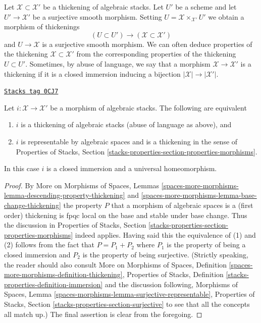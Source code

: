 Let $\mathcal{X} \subset \mathcal{X}'$ be a thickening of algebraic stacks.
Let $U'$ be a scheme and let $U' \to \mathcal{X}'$ be a surjective smooth
morphism. Setting $U = \mathcal{X} \times_{\mathcal{X}'} U'$ we obtain
a morphism of thickenings
$$
(U \subset U') \longrightarrow (\mathcal{X} \subset \mathcal{X}')
$$
and $U \to \mathcal{X}$ is a surjective smooth morphism. We can often
deduce properties of the thickening $\mathcal{X} \subset \mathcal{X}'$
from the corresponding properties of the thickening $U \subset U'$.
Sometimes, by abuse of language, we say that a morphism
$\mathcal{X} \to \mathcal{X}'$ is a thickening if it is a closed
immersion inducing a bijection $|\mathcal{X}| \to |\mathcal{X}'|$.

\begin{lemma}[Thickening]
\label{stacks-more-morphisms-lemma-thickening}
\href{https://stacks.math.columbia.edu/tag/0CJ7}{\texttt{Stacks tag 0CJ7}}

Let $i : \mathcal{X} \to \mathcal{X}'$ be a morphism of algebraic stacks.
The following are equivalent
\begin{enumerate}
\item $i$ is a thickening of algebraic stacks (abuse of language as above), and
\item $i$ is representable by algebraic spaces and
is a thickening in the sense of Properties of Stacks, Section
\ref{stacks-properties-section-properties-morphisms}.
\end{enumerate}
In this case $i$ is a closed immersion and a universal homeomorphism.
\end{lemma}

\begin{proof}
By More on Morphisms of Spaces, Lemmas
\ref{spaces-more-morphisms-lemma-descending-property-thickening} and
\ref{spaces-more-morphisms-lemma-base-change-thickening}
the property $P$ that a morphism of algebraic spaces is a
(first order) thickening is fpqc local on the base and stable under base
change. Thus the discussion in Properties of Stacks, Section
\ref{stacks-properties-section-properties-morphisms} indeed applies.
Having said this the equivalence of (1) and (2) follows from
the fact that $P = P_1 + P_2$ where $P_1$ is the property of being
a closed immersion and $P_2$ is the property of being surjective.
(Strictly speaking, the reader should also consult
More on Morphisms of Spaces, Definition
\ref{spaces-more-morphisms-definition-thickening},
Properties of Stacks, Definition \ref{stacks-properties-definition-immersion}
and the discussion following, Morphisms of Spaces, Lemma
\ref{spaces-morphisms-lemma-surjective-representable},
Properties of Stacks, Section \ref{stacks-properties-section-surjective}
to see that all the concepts all match up.)
The final assertion is clear from the foregoing.
\end{proof}

